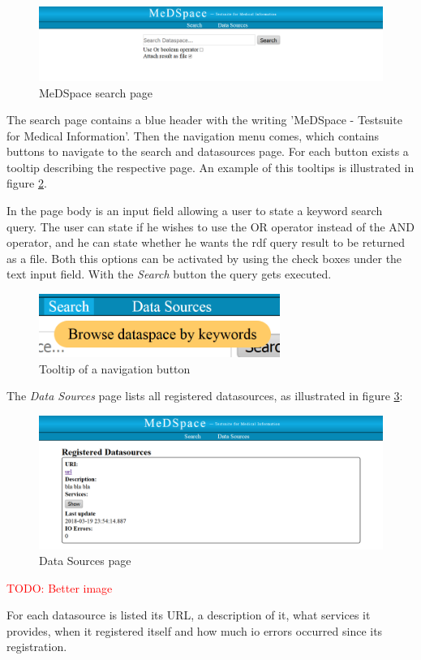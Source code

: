\begin{figure}[H]
	\begin{center}
		\includegraphics[width=1\textwidth]{figures/MeDSpace-GUI-Search-Main.png}
	\end{center}
	\caption{MeDSpace search page}
	\label{MeDSpaceSearchPage}
\end{figure}

The search page contains a blue header with the writing 'MeDSpace - Testsuite for Medical Information'. Then the navigation menu comes, which contains buttons to navigate to the search and datasources page. For each button exists a tooltip describing the respective page. An example of this tooltips is illustrated in figure \ref{MeDSpaceDataTooltip}. 

In the page body is an input field allowing a user to state a keyword search query. The user can state if he wishes to use the OR operator instead of the AND operator, and he can state whether he wants the rdf query result to be returned as a file. Both this options can be activated by using the check boxes under the text input field. With the \emph{Search} button the query gets executed.

\begin{figure}[H]
	\begin{center}
		\includegraphics[width=0.7\textwidth]{figures/MeDSpace-GUI-Tooltip.png}
	\end{center}
	\caption{Tooltip of a navigation button}
	\label{MeDSpaceDataTooltip}
\end{figure}


The \emph{Data Sources} page lists all registered datasources, as illustrated in figure \ref{MeDSpaceDataSourcePage}: 

\begin{figure}[H]
	\begin{center}
		\includegraphics[width=1\textwidth]{figures/MeDSpace-GUI-Datasources.png}
	\end{center}
	\caption{Data Sources page}
	\label{MeDSpaceDataSourcePage}
\end{figure}

\textcolor{red}{TODO: Better image}

For each datasource is listed its URL, a description of it, what services it provides, when it registered itself and how much io errors occurred since its registration.